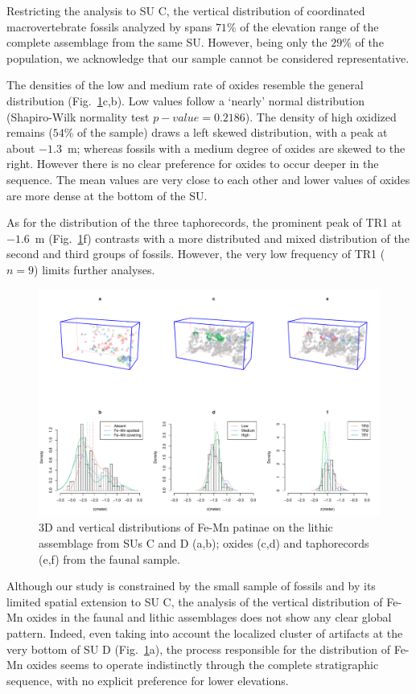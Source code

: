\documentclass[5p,authoryear]{elsarticle} %
\begin{document}
Restricting the analysis to SU C, the vertical distribution of coordinated macrovertebrate fossils analyzed by \cite{Bagnus2011} spans $71\%$ of the elevation range of the complete assemblage from the same SU. However, being only the $29\%$ of the population, we acknowledge that our sample cannot be considered representative.

The densities of the low and medium rate of oxides resemble the general distribution (Fig.~\ref{fig:4}c,b). Low values follow a ‘nearly’ normal distribution (Shapiro-Wilk normality test $p-value=0.2186$). The density of high oxidized remains ($54\%$ of the sample) draws a left skewed distribution, with a peak at about $-1.3$~m; whereas fossils with a medium degree of oxides are skewed to the right. However there is no clear preference for oxides to occur deeper in the sequence. The mean values are very close to each other and lower values of oxides are more dense at the bottom of the SU.

As for the distribution of the three taphorecords, the prominent peak of TR1 at $-1.6$~m (Fig.~\ref{fig:4}f) contrasts with a more distributed and mixed distribution of the second and third groups of fossils. However, the very low frequency of TR1 ($n=9$) limits further analyses.

\begin{figure}[t]
  \centering
  \includegraphics[width=1\textwidth]{../artwork/Fig4.pdf}
  \caption{3D and vertical distributions of Fe-Mn patinae on the lithic assemblage from SUs C and D (a,b); oxides (c,d) and taphorecords (e,f) from the faunal sample.}
  \label{fig:4}
\end{figure}

Although our study is constrained by the small sample of fossils and by its limited spatial extension to SU C, the analysis of the vertical distribution of Fe-Mn oxides in the faunal and lithic assemblages does not show any clear global pattern. Indeed, even taking into account the localized cluster of artifacts at the very bottom of SU D (Fig.~\ref{fig:4}a), the process responsible for the distribution of Fe-Mn oxides seems to operate indistinctly through the complete stratigraphic sequence, with no explicit preference for lower elevations.
\end{document}
